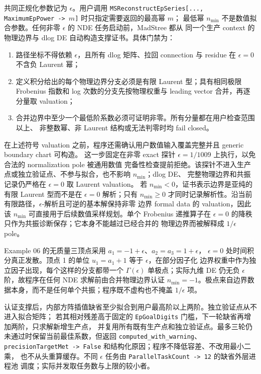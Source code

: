 \documentclass[11pt,a4paper]{ctexart}
\begin{document}
共同正规化参数记为 $\epsilon$。用户调用
\texttt{MSReconstructEpSeries[..., MaximumEpPower -> $m$]} 时只指定需要返回的最高幂 $m$；
最低幂 $n_{\min}$ 不是数值拟合参数。任何非零 $\epsilon$ 的 NDE 任务启动前，MadStree 都从
同一个生产 context 的物理边界与 dlog DE 自动构造支撑证书。具体门禁为：
\begin{enumerate}[label=\arabic*.]
  \item 路径坐标不得依赖 $\epsilon$，且所有 dlog 矩阵、拉回 connection 与 residue 在
  $\epsilon=0$ 不含负 Laurent 幂；
  \item 定义积分给出的每个物理边界分支必须是有限 Laurent 型；具有相同极限 Frobenius
  指数和 log 次数的分支先按物理权重与 leading vector 合并，再逐分量取 valuation；
  \item 合并边界中至少一个最低阶系数必须可证明非零。所有分量都在用户检查范围以上、
  非整数幂、非 Laurent 结构或无法判零时均 fail closed。
\end{enumerate}
在上述符号 valuation 之前，程序还需确认用户数值输入覆盖完整并且 generic boundary chart 可构造。
这一步固定在非零 exact 探针 $\epsilon=1/1009$ 上执行，以免合法的 normalization pole 被通用数值
完备性检查提前拒绝。该探针不进入生产点或独立验证点、不参与拟合，也不影响 $n_{\min}$；dlog DE、
完整物理边界和共振记录仍严格在 $\epsilon=0$ 取 Laurent valuation。
若 $n_{\min}<0$，证书表示边界是亚纯的有限 Laurent 型而不是在 $\epsilon=0$ 解析；只有
$n_{\min}\geq0$ 才同时记录解析性。沿当前有限路径，$\epsilon$-解析且可逆的基本解保持非零
边界 formal data 的 valuation，因此该 $n_{\min}$ 可直接用于后续数值采样规划。单个
Frobenius 递推算子在 $\epsilon=0$ 的降秩只作为共振诊断保存；它本身不能越过已经合并的
物理边界而被解释成 $1/\epsilon$ pole。

Example 06 的无质量三顶点采用 $a_1=-1+\epsilon$、$a_2=a_3=1+\epsilon$，
$\epsilon=0$ 处时间积分真正发散。顶点 1 的单位 $u_1=a_1+1$ 等于 $\epsilon$，在部分因子化
边界权重中作为独立因子出现，每个这样的分支都带一个 $\Gamma(\epsilon)$ 单极点；实际九维 DE
仍无负 $\epsilon$ 阶，故程序在任何 NDE 求解前由合并物理边界认证
$n_{\min}=-1$。极点来自边界数据本身，而不是任何单个共振；程序既不虚构也不掩盖
$1/\epsilon$ 项。

认证支撑后，内部方阵插值缺省至少拟合到用户最高阶以上两阶。独立验证点从不进入拟合矩阵；
若其相对残差高于固定的 \texttt{EpGoalDigits} 门槛，下一轮缺省再增加两阶，只求解新增生产点，
并复用所有既有生产点和独立验证点。最多三轮仍未通过时保留当前最佳系数，但返回
\texttt{computed\_with\_warning}、\texttt{precisionTargetMet -> False} 和结构化原因；程序不降低容差、不改用最小二乘，
也不从头重算缓存。不同 $\epsilon$ 任务由 \texttt{ParallelTaskCount -> 12} 的缺省外层进程池
调度；实际并发取任务数与上限的较小者。
\end{document}
